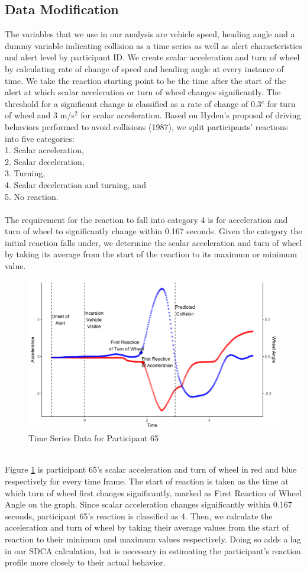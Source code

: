 \documentclass{article}
\begin{document}
\subsection{Data Modification}
The variables that we use in our analysis are vehicle speed, heading angle and a dummy variable indicating collision as a time series as well as alert characteristics and alert level by participant ID. We create scalar acceleration and turn of wheel by calculating rate of change of speed and heading angle at every instance of time. We take the reaction starting point to be the time after the start of the alert at which scalar acceleration or turn of wheel changes significantly. The threshold for a significant change is classified as a rate of change of 0.3$^c$ for turn of wheel and 3 m/s$^2$ for scalar acceleration. Based on Hyden's proposal of driving behaviors performed to avoid collisions (1987), we split participants' reactions into five categories:\\
1. Scalar acceleration,\\
2. Scalar deceleration,\\
3. Turning,\\
4. Scalar deceleration and turning, and\\
5. No reaction.\\ \\
The requirement for the reaction to fall into category 4 is for acceleration and turn of wheel to significantly change within 0.167 seconds. Given the category the initial reaction falls under, we determine the scalar acceleration and turn of wheel by taking its average from the start of the reaction to its maximum or minimum value.\\
\begin{figure}[h!]
\includegraphics[width = 12cm, height = 7 cm]{fig1.png}
\caption{Time Series Data for Participant 65}
\label{figure 1}
\end{figure}\\
Figure \ref{figure 1} is participant 65's scalar acceleration and turn of wheel in red and blue respectively for every time frame. The start of reaction is taken as the time at which turn of wheel first changes significantly, marked as First Reaction of Wheel Angle on the graph. Since scalar acceleration changes significantly within 0.167 seconds, participant 65's reaction is classified as 4. Then, we calculate the acceleration and turn of wheel by taking their average values from the start of reaction to their minimum and maximum values respectively. Doing so adds a lag in our SDCA calculation, but is necessary in estimating the participant's reaction profile more closely to their actual behavior.
\end{document}
